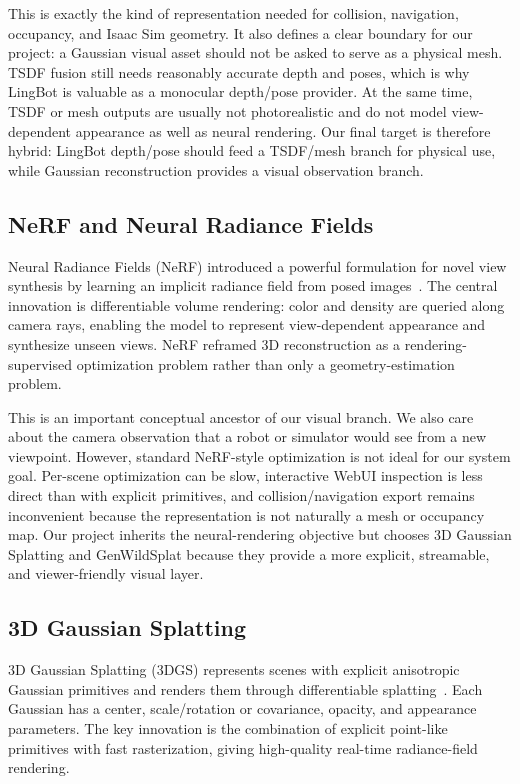\documentclass[11pt]{article}
\begin{document}
This is exactly the kind of representation needed for collision, navigation, occupancy, and Isaac Sim geometry. It also defines a clear boundary for our project: a Gaussian visual asset should not be asked to serve as a physical mesh. TSDF fusion still needs reasonably accurate depth and poses, which is why LingBot is valuable as a monocular depth/pose provider. At the same time, TSDF or mesh outputs are usually not photorealistic and do not model view-dependent appearance as well as neural rendering. Our final target is therefore hybrid: LingBot depth/pose should feed a TSDF/mesh branch for physical use, while Gaussian reconstruction provides a visual observation branch.

\subsection{NeRF and Neural Radiance Fields}

Neural Radiance Fields (NeRF) introduced a powerful formulation for novel view synthesis by learning an implicit radiance field from posed images~\cite{mildenhall2020nerf}. The central innovation is differentiable volume rendering: color and density are queried along camera rays, enabling the model to represent view-dependent appearance and synthesize unseen views. NeRF reframed 3D reconstruction as a rendering-supervised optimization problem rather than only a geometry-estimation problem.

This is an important conceptual ancestor of our visual branch. We also care about the camera observation that a robot or simulator would see from a new viewpoint. However, standard NeRF-style optimization is not ideal for our system goal. Per-scene optimization can be slow, interactive WebUI inspection is less direct than with explicit primitives, and collision/navigation export remains inconvenient because the representation is not naturally a mesh or occupancy map. Our project inherits the neural-rendering objective but chooses 3D Gaussian Splatting and GenWildSplat because they provide a more explicit, streamable, and viewer-friendly visual layer.

\subsection{3D Gaussian Splatting}

3D Gaussian Splatting (3DGS) represents scenes with explicit anisotropic Gaussian primitives and renders them through differentiable splatting~\cite{kerbl2023gaussians}. Each Gaussian has a center, scale/rotation or covariance, opacity, and appearance parameters. The key innovation is the combination of explicit point-like primitives with fast rasterization, giving high-quality real-time radiance-field rendering.
\end{document}
